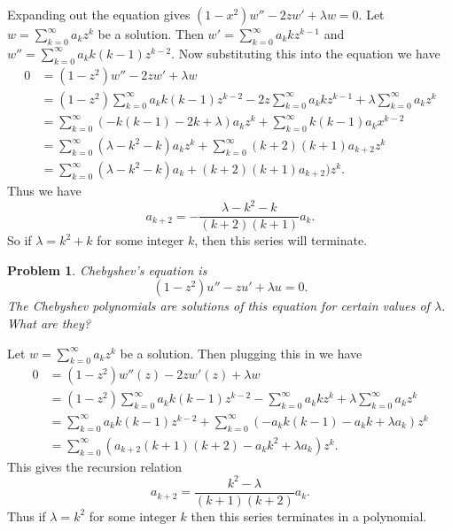 \documentclass{article}
\newtheorem{problem}{Problem}
\begin{document}
Expanding out the equation gives $(1-x^2) w'' - 2z w' + \lambda w = 0$. Let $w = \sum_{k=0}^{\infty} a_k z^k$ be a solution. Then $w' = \sum_{k=0}^{\infty} a_k k z^{k-1}$ and $w'' = \sum_{k=0}^{\infty} a_k k (k-1) z^{k-2}$. Now substituting this into the equation we have
\begin{align*}
0
&= (1 - z^2) w'' - 2z w' + \lambda w\\
&= (1 - z^2) \sum_{k=0}^{\infty} a_k k (k-1) z^{k-2} - 2z \sum_{k=0}^{\infty} a_k k z^{k-1} + \lambda \sum_{k=0}^{\infty} a_k z^k\\
&= \sum_{k=0}^{\infty} (-k(k-1) - 2k + \lambda) a_k z^k + \sum_{k=0}^{\infty} k(k-1) a_k x^{k-2}\\
&= \sum_{k=0}^{\infty} (\lambda - k^2 - k) a_k z^k + \sum_{k=0}^{\infty} (k+2)(k+1) a_{k+2} z^k\\
& = \sum_{k=0}^{\infty} (\lambda - k^2 - k) a_k + (k+2)(k+1)a_{k+2}) z^k.
\end{align*}
Thus we have
\[
a_{k+2} = - \frac{\lambda - k^2 - k}{(k+2)(k+1)} a_k.
\]
So if $\lambda = k^2 + k$ for some integer $k$, then this series will terminate.

\begin{problem}
Chebyshev's equation is
\[
(1 - z^2) u'' - zu' + \lambda u = 0.
\]
The Chebyshev polynomials are solutions of this equation for certain values of $\lambda$. What are they?
\end{problem}

Let $w = \sum_{k=0}^{\infty} a_k z^k$ be a solution. Then plugging this in we have
\begin{align*}
0
&= (1-z^2) w''(z) - 2z w'(z) + \lambda w\\
&= (1-z^2) \sum_{k=0}^{\infty} a_k k(k-1) z^{k-2} - \sum_{k=0}^{\infty} a_k k z^k + \lambda \sum_{k=0}^{\infty} a_k z^k\\
&= \sum_{k=0}^{\infty} a_k k(k-1) z^{k-2} + \sum_{k=0}^{\infty} (-a_k k(k-1) - a_k k + \lambda a_k) z^k\\
&= \sum_{k=0}^{\infty} ( a_{k+2} (k+1)(k+2) - a_k k^2 + \lambda a_k ) z^k.
\end{align*}
This gives the recursion relation
\[
a_{k+2} = \frac{k^2 - \lambda}{(k+1)(k+2)} a_k.
\]
Thus if $\lambda = k^2$ for some integer $k$ then this series terminates in a polynomial.
\end{document}
